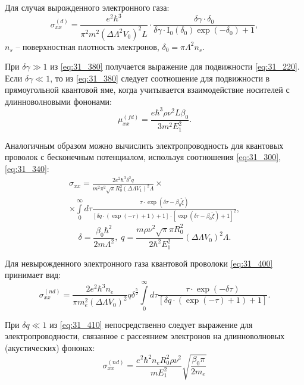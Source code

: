 Для случая вырожденного электронного газа:
\begin{equation} \label{eq:31_380}
\sigma _{xx}^{(d)} =\frac{e^2 \hbar^3 }{\pi^2 m^2 \left(\Delta \Lambda^2 V_0 \right)^2 L} \cdot 
\frac{\delta \gamma \cdot \delta_0 }{\delta \gamma \cdot \mathrm{I}_0 \left(\delta_0 \right)\exp\left(-\delta_0 \right)+1} ,
\end{equation}
$n_s $ -- поверхностная плотность электронов, $\delta_0 =\pi \Lambda^2 n_s $.

При $\delta \gamma \gg 1$ из \eqref{eq:31_380} получается выражение для подвижности \eqref{eq:31_220}. Если $\delta \gamma \ll 1$, то из \eqref{eq:31_380} следует соотношение для подвижности в прямоугольной квантовой яме, когда учитывается взаимодействие носителей с длинноволновыми фононами:
\begin{equation} \label{eq:31_390}
\mu _{xx}^{(fd)} =\frac{e\hbar^3 \rho \nu^2 L\beta_0 }{3 m^2 E_1^2 }. 
\end{equation}
 
Аналогичным образом можно вычислить электропроводность для квантовых проволок с бесконечным потенциалом, используя соотношения \eqref{eq:31_300}, \eqref{eq:31_340}:
\begin{multline} \label{eq:31_400}
\sigma _{xx} =\frac{2e^2 \hbar^3 \delta^2 q}{m^2 \pi^2 \sqrt{\pi } R_0^2 \left(\Delta \Lambda V_1 \right)^2 \Lambda } \times\\
\times\int\limits_0^{\infty} {d\tau \frac{\tau \cdot {\exp}\left(\delta \tau -\beta _{0} \tilde{\xi }\right)}{\left[\delta q\cdot \left(\exp(-\tau) +1 \right)+1\right]\cdot \left[{\exp}\left(\delta \tau -\beta _{0} \tilde{\xi }\right)+1\right]^{2} }}, 
\end{multline}
\[
\delta =\frac{\beta_0 \hbar^2 }{2m\Lambda^2 }, \;
q=\frac{m \rho \nu^2 \sqrt{\pi } \pi R_0^2 }{2\hbar^2 E_1^2 } \left(\Delta \Lambda V_0 \right)^2 \Lambda .
\] 

Для невырожденного электронного газа квантовой проволоки \eqref{eq:31_400} принимает вид:
\begin{equation} \label{eq:31_410}
\sigma_{xx}^{(nd)} =\frac{2e^2 \hbar^3 n_e }{\pi m_e^2 \left(\Delta \Lambda V_0 \right)^2 } q \delta ^{\frac{5}{2} }
\int\limits_0^{\infty }{d\tau \frac{\tau \cdot \exp (-\delta \tau )}{\left[\delta q\cdot \left( \exp(-\tau )+1\right)+1\right]}}. 
\end{equation}

При $\delta q \ll 1$ из \eqref{eq:31_410} непосредственно следует выражение для электропроводности, связанное с рассеянием электронов на длинноволновых (акустических) фононах:
\begin{equation} \label{eq:31_420}
\sigma _{xx}^{(nd)} =\frac{e^2 \hbar^2 n_e R_0^2 \rho \nu^2 }{m E_1^2 } \sqrt{\frac{\beta_0 \pi }{2m_e} }
\end{equation}

